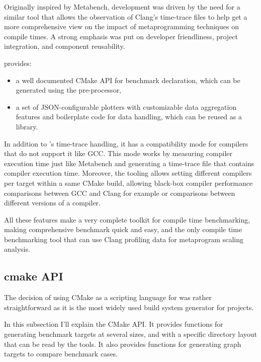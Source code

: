 \documentclass[../../main.tex]{subfiles}
\begin{document}
Originally inspired by Metabench\cite{metabench}, \ctbench development was
driven by the need for a similar tool that allows the observation of Clang's
time-trace files to help get a more comprehensive view on the impact of
metaprogramming techniques on compile times. A strong emphasis was put on
developer friendliness, project integration, and component reusability.

\ctbench provides:

\begin{itemize}
\item a well documented CMake API for benchmark declaration, which can be
      generated using the \cpp pre-processor,
\item a set of JSON-configurable plotters with customizable data aggregation
      features and boilerplate code for data handling, which can be reused as a
      \cpp library.
\end{itemize}

In addition to \ctbench's time-trace handling, it has a compatibility mode
for compilers that do not support it like GCC. This mode works by measuring
compiler execution time just like Metabench\cite{metabench} and generating a
time-trace file that contains compiler execution time. Moreover, the tooling
allows setting different compilers per target within a same CMake build,
allowing black-box compiler performance comparisons between GCC and Clang for
example or comparisons between different versions of a compiler.

All these features make \ctbench a very complete toolkit for compile time
benchmarking, making comprehensive benchmark quick and easy, and the only
compile time benchmarking tool that can use Clang profiling data for metaprogram
scaling analysis.

\subsection{cmake API}

The decision of using CMake as a scripting language for \ctbench was rather
straightforward as it is the most widely used build system generator for \cpp
projects.

In this subsection I'll explain the CMake API. It provides functions for
generating benchmark targets at several sizes, and with a specific directory
layout that can be read by the \grapher tools. It also provides functions for
generating graph targets to compare benchmark cases.
\end{document}
